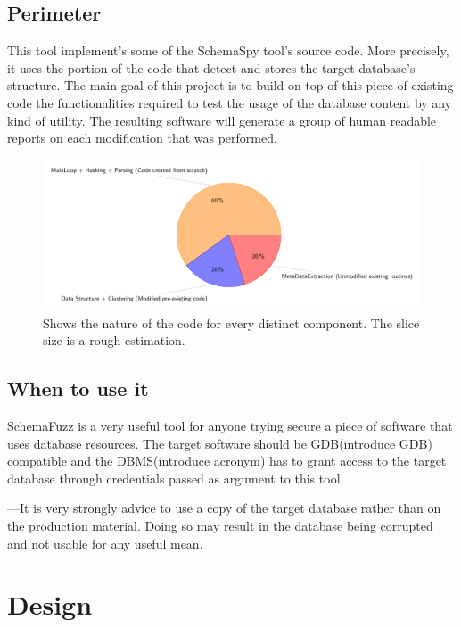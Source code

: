 \documentclass{article}
\begin{document}
\begin{empfile}
		\subsection{Perimeter}
This tool implement's some of the SchemaSpy tool's source code. More precisely, it uses the portion of the code that detect and stores the target database's structure.
The main goal of this project is to build on top of this piece of existing code the functionalities required to test the usage of the database content by any kind of utility.  		
The resulting software will generate a group of human readable reports on each modification that was performed.		
		\begin{figure} [h!]
		\includegraphics[width=\textwidth]{codeOriginDiagram.pdf}
		\caption{Shows the nature of the code for every distinct component. The slice size is a rough estimation.}
		\end{figure}
		\subsection{When to use it}
SchemaFuzz is a very useful tool for anyone trying secure a piece of software that uses database resources. The target software should be GDB(introduce GDB) compatible and the DBMS(introduce acronym) has to grant access to the target database through credentials passed as argument to this tool.

---It is very strongly advice to use a copy of the target database rather than on the production material. Doing so may result in the database being corrupted and not usable for any useful mean.

		\clearpage

	\section{Design}

\end{empfile}
\end{document}
